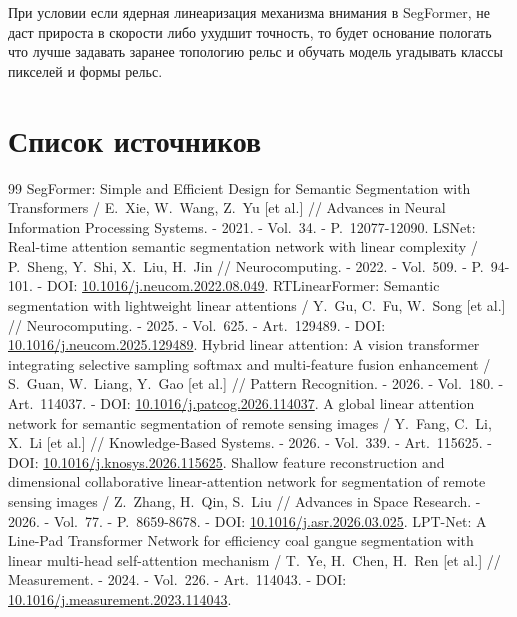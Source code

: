 \documentclass[areasetadvanced]{scrartcl}
\begin{document}
	При условии если ядерная линеаризация механизма внимания в SegFormer, не даст  
	прироста в скорости либо ухудшит точность, то будет основание пологать 
	что лучше задавать заранее топологию рельс и обучать модель угадывать классы пикселей 
	и формы рельс. 

\newpage
\section*{Список источников}

\makeatletter
\renewcommand*{\bib@heading}{}
\makeatother

\begin{thebibliography}{99}
	 SegFormer: Simple and Efficient Design for Semantic Segmentation with Transformers / E.~Xie, W.~Wang, Z.~Yu [et al.] // Advances in Neural Information Processing Systems. - 2021. - Vol.~34. - P.~12077-12090.
	 LSNet: Real-time attention semantic segmentation network with linear complexity / P.~Sheng, Y.~Shi, X.~Liu, H.~Jin // Neurocomputing. - 2022. - Vol.~509. - P.~94-101. - DOI: \href{https://doi.org/10.1016/j.neucom.2022.08.049}{10.1016/j.neucom.2022.08.049}.
	 RTLinearFormer: Semantic segmentation with lightweight linear attentions / Y.~Gu, C.~Fu, W.~Song [et al.] // Neurocomputing. - 2025. - Vol.~625. - Art.~129489. - DOI: \href{https://doi.org/10.1016/j.neucom.2025.129489}{10.1016/j.neucom.2025.129489}.
	 Hybrid linear attention: A vision transformer integrating selective sampling softmax and multi-feature fusion enhancement / S.~Guan, W.~Liang, Y.~Gao [et al.] // Pattern Recognition. - 2026. - Vol.~180. - Art.~114037. - DOI: \href{https://doi.org/10.1016/j.patcog.2026.114037}{10.1016/j.patcog.2026.114037}.
	 A global linear attention network for semantic segmentation of remote sensing images / Y.~Fang, C.~Li, X.~Li [et al.] // Knowledge-Based Systems. - 2026. - Vol.~339. - Art.~115625. - DOI: \href{https://doi.org/10.1016/j.knosys.2026.115625}{10.1016/j.knosys.2026.115625}.
	 Shallow feature reconstruction and dimensional collaborative linear-attention network for segmentation of remote sensing images / Z.~Zhang, H.~Qin, S.~Liu // Advances in Space Research. - 2026. - Vol.~77. - P.~8659-8678. - DOI: \href{https://doi.org/10.1016/j.asr.2026.03.025}{10.1016/j.asr.2026.03.025}.
	 LPT-Net: A Line-Pad Transformer Network for efficiency coal gangue segmentation with linear multi-head self-attention mechanism / T.~Ye, H.~Chen, H.~Ren [et al.] // Measurement. - 2024. - Vol.~226. - Art.~114043. - DOI: \href{https://doi.org/10.1016/j.measurement.2023.114043}{10.1016/j.measurement.2023.114043}.

\end{thebibliography}
\end{document}
